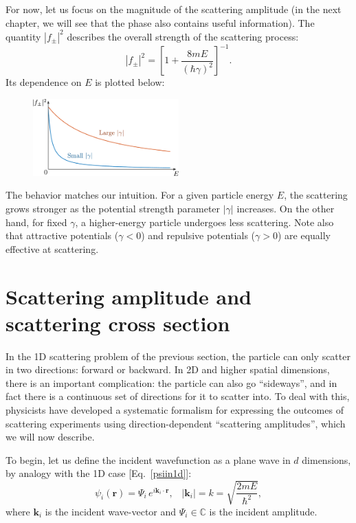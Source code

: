 \documentclass[prx,12pt]{revtex4-2}
\begin{document}
For now, let us focus on the magnitude of the scattering amplitude (in
the next chapter, we will see that the phase also contains useful
information).  The quantity $|f_\pm|^2$ describes the overall strength
of the scattering process:
\begin{equation}
  |f_\pm|^2 = \left[1 + \frac{8mE}{(\hbar\gamma)^2}\right]^{-1}.
\end{equation}
Its dependence on $E$ is plotted below:

\begin{figure}[h]
  \centering\includegraphics[width=0.5\textwidth]{scattering1df}
\end{figure}

\noindent
The behavior matches our intuition.  For a given particle energy $E$,
the scattering grows stronger as the potential strength parameter
$|\gamma|$ increases.  On the other hand, for fixed $\gamma$, a
higher-energy particle undergoes less scattering.  Note also that
attractive potentials ($\gamma < 0$) and repulsive potentials ($\gamma
> 0$) are equally effective at scattering.

\section{Scattering amplitude and scattering cross section}
\label{sec:scattering_amplitude}

In the 1D scattering problem of the previous section, the particle can
only scatter in two directions: forward or backward.  In 2D and higher
spatial dimensions, there is an important complication: the particle
can also go ``sideways'', and in fact there is a continuous set of
directions for it to scatter into.  To deal with this, physicists have
developed a systematic formalism for expressing the outcomes of
scattering experiments using direction-dependent ``scattering
amplitudes'', which we will now describe.

To begin, let us define the incident wavefunction as a plane wave in
$d$ dimensions, by analogy with the 1D case [Eq.~\eqref{psiin1d}]:
\begin{equation}
  \psi_i(\mathbf{r}) = \Psi_i \, e^{i\mathbf{k}_i\cdot\mathbf{r}},
  \;\;\; |\mathbf{k}_i| = k = \sqrt{\frac{2mE}{\hbar^2}},
  \label{psiin}
\end{equation}
where $\mathbf{k}_i$ is the incident wave-vector and $\Psi_i \in
\mathbb{C}$ is the incident amplitude.
\end{document}

